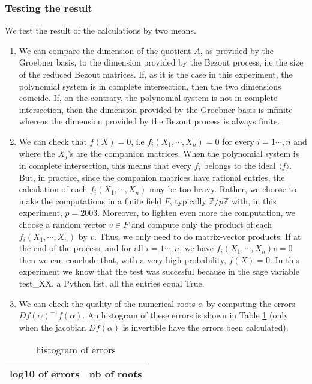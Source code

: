 \documentclass{standalone}
\begin{document}
\subsubsection{Testing the result}
\label{testing_the_result}
We test the result of the calculations by two means. 
\begin{enumerate}
\item
We can compare the dimension of the quotient $A$, as provided by the Groebner basis, to the dimension provided by the Bezout process, i.e the size of the reduced Bezout matrices. If, as it is the case in this experiment, the polynomial system is in complete intersection, then the two dimensions coincide. If, on the contrary, the polynomial system is not in complete intersection, then the dimension provided by the Groebner basis is infinite whereas the dimension provided by the Bezout process is always finite.
\item
We can check that $f(X) = 0$, i.e $f_i(X_1,\cdots, X_n) = 0$ for every $i = 1\cdots, n$ and where the $X_j$'s are the companion matrices. When the polynomial system is in complete intersection, this means that every $f_i$ belongs to the ideal $\langle f\rangle$. But, in practice, since the companion matrices have rational entries, the calculation of each $f_i(X_1,\cdots, X_n)$ may be too heavy. Rather, we choose to make the computations in a finite field $F$, typically $\mathbb{Z}/ p\mathbb{Z}$ with, in this experiment, $p = 2003$. Moreover, to lighten even more the computation, we choose a random vector $v\in F$ and compute only the product of each $f_i(X_1,\cdots, X_n)$ by $v$. Thus, we only need to do matrix-vector products. If at the end of the process, and for all $i= 1\cdots, n$, we have $f_i(X_1,\cdots, X_n)v = 0$ then we can conclude that, with a very high probability, $f(X) = 0$. In this experiment we know that the test was succesful because in the sage variable test\_XX, a Python list, all the entries equal True.
\item
We can check the quality of the numerical roots $\alpha$ by computing the errors $Df(\alpha)^{-1}f(\alpha)$. An histogram of these errors is shown in Table \ref{tab:histo} (only when the jacobian $Df(\alpha)$ is invertible have the errors been calculated).
\end{enumerate}

\begin{table}[h]
\begin{center}
\begin{tabular}{c|c}
 log10 of errors & nb of roots \\ 
 \hline
 
\end{tabular}
\end{center}
\caption{histogram of errors}
\label{tab:histo}
\end{table}
\end{document}
